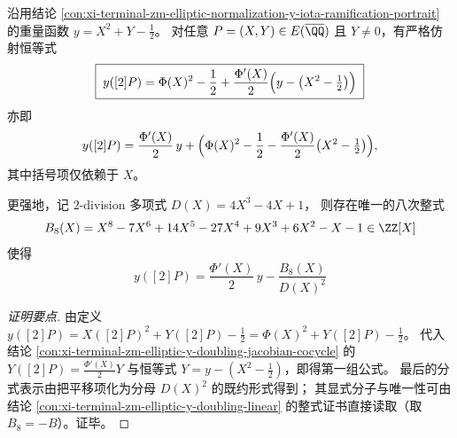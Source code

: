 \begin{conclusion}\label{con:xi-terminal-zm-elliptic-y-doubling-affine-cocycle-derivative}
沿用结论 \ref{con:xi-terminal-zm-elliptic-normalization-y-iota-ramification-portrait} 的重量函数
\(
y=X^{2}+Y-\tfrac12
\)。
对任意 \(P=(X,Y)\in E(\overline{\QQ})\) 且 \(Y\neq 0\)，有严格仿射恒等式
\[
\boxed{\;
y([2]P)
=\Phi(X)^{2}-\frac12+\frac{\Phi'(X)}{2}\Bigl(y-\bigl(X^{2}-\tfrac12\bigr)\Bigr)\;}
\]
亦即
\[
y([2]P)=\frac{\Phi'(X)}{2}\,y
+\Bigl(\Phi(X)^{2}-\frac12-\frac{\Phi'(X)}{2}\bigl(X^{2}-\tfrac12\bigr)\Bigr),
\]
其中括号项仅依赖于 \(X\)。
\par
更强地，记 \(2\)-division 多项式
\(
D(X)=4X^{3}-4X+1
\)，
则存在唯一的八次整式
\[
B_{8}(X)=X^{8}-7X^{6}+14X^{5}-27X^{4}+9X^{3}+6X^{2}-X-1\in\ZZ[X]
\]
使得
\[
\boxed{\;
y([2]P)=\frac{\Phi'(X)}{2}\,y-\frac{B_{8}(X)}{D(X)^{2}}\;}
\]
\end{conclusion}
\begin{proof}[证明要点]
由定义 \(y([2]P)=X([2]P)^{2}+Y([2]P)-\tfrac12=\Phi(X)^{2}+Y([2]P)-\tfrac12\)。
代入结论 \ref{con:xi-terminal-zm-elliptic-y-doubling-jacobian-cocycle} 的
\(
Y([2]P)=\frac{\Phi'(X)}{2}Y
\)
与恒等式 \(Y=y-(X^{2}-\tfrac12)\)，即得第一组公式。
最后的分式表示由把平移项化为分母 \(D(X)^{2}\) 的既约形式得到；
其显式分子与唯一性可由结论 \ref{con:xi-terminal-zm-elliptic-y-doubling-linear} 的整式证书直接读取（取 \(B_{8}=-B\)）。证毕。
\end{proof}

